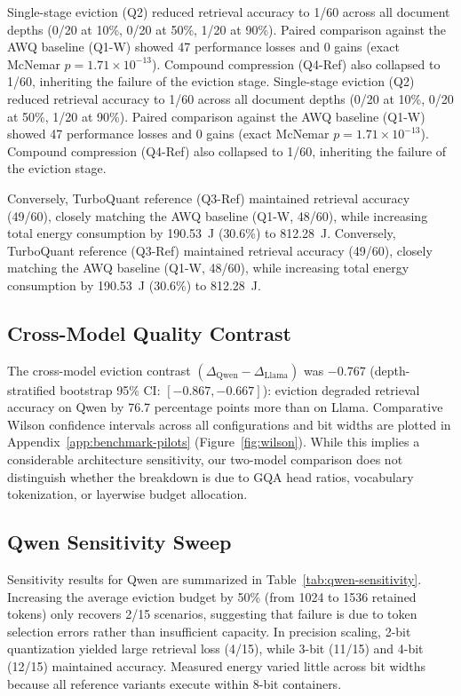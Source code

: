 \documentclass[sigconf,nonacm]{acmart}
\begin{document}
Single-stage eviction (Q2) reduced retrieval accuracy to 1/60 across all document depths (0/20 at 10\%, 0/20 at 50\%, 1/20 at 90\%). Paired comparison against the AWQ baseline (Q1-W) showed 47 performance losses and 0 gains (exact McNemar $p = 1.71 \times 10^{-13}$). Compound compression (Q4-Ref) also collapsed to 1/60, inheriting the failure of the eviction stage.
Single-stage eviction (Q2) reduced retrieval accuracy to 1/60 across all document depths (0/20 at 10\%, 0/20 at 50\%, 1/20 at 90\%). Paired comparison against the AWQ baseline (Q1-W) showed 47 performance losses and 0 gains (exact McNemar $p = 1.71 \times 10^{-13}$). Compound compression (Q4-Ref) also collapsed to 1/60, inheriting the failure of the eviction stage.

Conversely, TurboQuant reference (Q3-Ref) maintained retrieval accuracy (49/60), closely matching the AWQ baseline (Q1-W, 48/60), while increasing total energy consumption by 190.53~J (30.6\%) to 812.28~J.
Conversely, TurboQuant reference (Q3-Ref) maintained retrieval accuracy (49/60), closely matching the AWQ baseline (Q1-W, 48/60), while increasing total energy consumption by 190.53~J (30.6\%) to 812.28~J.

\subsection{Cross-Model Quality Contrast}

The cross-model eviction contrast $(\Delta_{\text{Qwen}} - \Delta_{\text{Llama}})$ was $-0.767$ (depth-stratified bootstrap 95\% CI: $[-0.867, -0.667]$): eviction degraded retrieval accuracy on Qwen by 76.7 percentage points more than on Llama. Comparative Wilson confidence intervals across all configurations and bit widths are plotted in Appendix~\ref{app:benchmark-pilots} (Figure~\ref{fig:wilson}). While this implies a considerable architecture sensitivity, our two-model comparison does not distinguish whether the breakdown is due to GQA head ratios, vocabulary tokenization, or layerwise budget allocation.

\subsection{Qwen Sensitivity Sweep}

Sensitivity results for Qwen are summarized in Table~\ref{tab:qwen-sensitivity}. Increasing the average eviction budget by 50\% (from 1024 to 1536 retained tokens) only recovers 2/15 scenarios, suggesting that failure is due to token selection errors rather than insufficient capacity. In precision scaling, 2-bit quantization yielded large retrieval loss (4/15), while 3-bit (11/15) and 4-bit (12/15) maintained accuracy. Measured energy varied little across bit widths because all reference variants execute within 8-bit containers.
\end{document}
